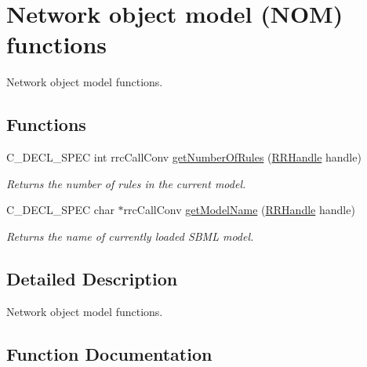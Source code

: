 \hypertarget{group___n_o_m}{}\section{Network object model (N\+O\+M) functions}
\label{group___n_o_m}


Network object model functions.  


\subsection*{Functions}
\begin{DoxyCompactItemize}
\item 
C\+\_\+\+D\+E\+C\+L\+\_\+\+S\+P\+E\+C int rrc\+Call\+Conv \hyperlink{group___n_o_m_ga97df6daacbf87b1b2d3b4dd3f4e05876}{get\+Number\+Of\+Rules} (\hyperlink{rrc__types_8h_a1d68f0592372208fa5a5f2799ea4b3ae}{R\+R\+Handle} handle)
\begin{DoxyCompactList}\small\item\em Returns the number of rules in the current model. \end{DoxyCompactList}\item 
C\+\_\+\+D\+E\+C\+L\+\_\+\+S\+P\+E\+C char $\ast$rrc\+Call\+Conv \hyperlink{group___n_o_m_gadd064802065aece47c2e966f9fff5958}{get\+Model\+Name} (\hyperlink{rrc__types_8h_a1d68f0592372208fa5a5f2799ea4b3ae}{R\+R\+Handle} handle)
\begin{DoxyCompactList}\small\item\em Returns the name of currently loaded S\+B\+M\+L model. \end{DoxyCompactList}\end{DoxyCompactItemize}


\subsection{Detailed Description}
Network object model functions. 



\subsection{Function Documentation}
\hypertarget{group___n_o_m_gadd064802065aece47c2e966f9fff5958}{}
